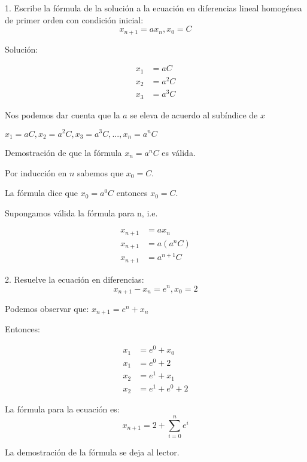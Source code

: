 \documentclass{article}
\begin{document}
1. Escribe la fórmula de la solución a la ecuación en diferencias lineal homogénea de primer orden con condición inicial:$$x_{n+1}=ax_n, x_0=C$$

Solución:

\begin{align*}
  x_1&=aC\\
  x_2&=a^2C\\
  x_3&=a^3C
\end{align*}

Nos podemos dar cuenta que la $a$ se eleva de acuerdo al subíndice de $x$

$x_{1}=aC, x_{2}=a^{2}C, x_{3}=a^{3}C, ..., x_{n}=a^{n}C$

Demostración de que  la fórmula $x_n=a^nC$ es válida.

Por inducción en $n$ sabemos que $x_0=C.$

La fórmula dice que $x_0=a^0C$ entonces $x_0=C.$


Supongamos válida la fórmula para n, i.e.

\begin{align*}
  x_{n+1}&=ax_n\\
  x_{n+1}&=a(a^nC)\\
  x_{n+1}&=a^{n+1}C
\end{align*}

2. Resuelve la ecuación en diferencias: $$x_{n+1}-x_n=e^n, x_0=2$$

Podemos observar que: $x_{n+1}=e^n+x_n$

Entonces:

\begin{align*}
  x_1&=e^0+x_0\\
x_1&=e^0+2\\
x_2&=e^1+x_1\\
  x_2&=e^1+e^0+2
\end{align*}

La fórmula para la ecuación es:
$$x_{n+1}=2+\sum_{i=0}^{n}e^i$$

La demostración de la fórmula se deja al lector.
\end{document}
